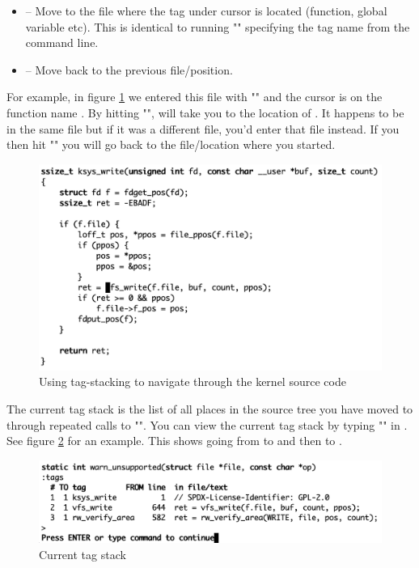 \begin{itemize}
	\item \cf{Ctrl + ]} -- Move to the file where the tag under cursor is located (function, global variable etc). This is 
		identical to running ""  specifying the tag name from the command line.
	\item {} -- Move back to the previous file/position.
\end{itemize}

\noindent
For example, in figure \ref{fig:tag-stacking} we entered this file with "" and the cursor is on
the function name . By hitting "\cf{Ctrl + ]}",  will take you to the location of . It happens to be in the same file but if it was a different file, you'd enter that file instead. If you then hit "" you will go back to the file/location where you started.

\begin{figure}
	\includegraphics[scale=0.6]{figures/tag-stacking.png}
	\centering
	\caption{Using tag-stacking to navigate through the kernel source code}
	\label{fig:tag-stacking}
\end{figure}

The current tag stack is the list of all places in the source tree you have moved to through repeated calls to "\cf{Ctrl + ]}". You can view the current tag stack by typing "" in . See figure \ref{fig:tag-stacking-2} for an example. This shows going from  to  and then to .

\begin{figure}[h]
	\includegraphics[scale=0.6]{figures/tag-stacking-2.png}
	\centering
	\caption{Current tag stack}
	\label{fig:tag-stacking-2}
\end{figure}


